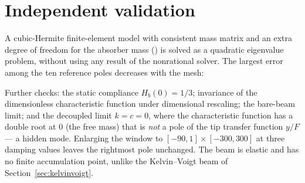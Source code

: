 \section{Independent validation}\label{sec:beamvalidation}

A cubic-Hermite finite-element model with consistent mass matrix and an
extra degree of freedom for the absorber mass ()
is solved as a quadratic eigenvalue problem, without using any result of the
nonrational solver. The largest error among the ten reference poles
decreases with the mesh:
\begin{center}\small\FEMTable\end{center}
Further checks: the static compliance $H_b(0)=1/3$; invariance of the
dimensionless characteristic function under dimensional rescaling; the
bare-beam limit; and the decoupled limit $k=c=0$, where the characteristic
function has a double root at $0$ (the free mass) that is \emph{not} a pole
of the tip transfer function $y/F$ --- a hidden mode. Enlarging the window
to $[-90,1]\times[-300,300]$ at three damping values leaves the rightmost
pole unchanged. The beam is elastic and has no finite accumulation point,
unlike the Kelvin--Voigt beam of Section~\ref{sec:kelvinvoigt}.
